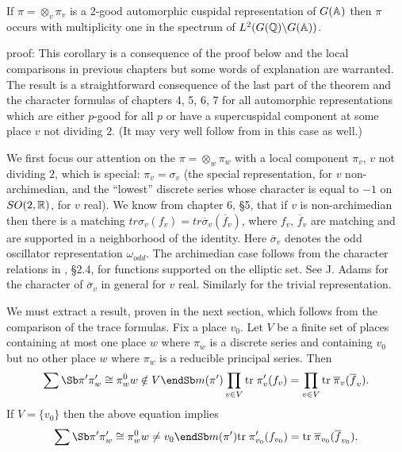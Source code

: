 \begin{corollary} If $\pi=\otimes_v \pi_v$ is a 2-good
automorphic cuspidal representation of $G({\Bbb{A}})$ then $\pi$
occurs with multiplicity one in the spectrum of
$L^2(G({\Bbb{Q}})\backslash G({\Bbb{A}}))$.
\end{corollary}

proof: This corollary is a consequence of the proof below and the local
comparisons in previous chapters but some words of
explanation are warranted.
The result is a straightforward consequence of
the last part of the theorem and the character formulas
of chapters 4, 5, 6, 7 for all automorphic representations
which are either $p$-good for all $p$ or have a supercuspidal
component at some place $v$ not dividing $2$. (It
may very well follow from \cite{LL} in this case as well.)

We first focus our attention on the $\pi=\otimes_w\pi_w$
with a local component $\pi_v$, $v$ not dividing $2$, which is
special: $\pi_v=\sigma_v$ (the special representation,
for $v$ non-archimedian, and the ``lowest'' discrete series
whose character is equal to $-1$ on $SO(2,{\Bbb{R}})$, for
$v$ real). We know from chapter 6, \S 5, that
if $v$ is non-archimedian then there is a matching
$tr \sigma_v(f_v)=tr\overline{\sigma}_v(\overline{f}_v)$,
where $f_v$, $\overline{f}_v$ are matching and are
supported in a neighborhood of the identity. Here
$\overline{\sigma}_v$ denotes the odd oscillator representation
$\omega_{odd}$. The archimedian case follows from
the character relations in \cite{Fl}, \S 2.4, for functions
supported on the elliptic set. See J. Adams \cite{Ad}
for the character of $\overline{\sigma}_v$ in general
for $v$ real. Similarly for the trivial representation.

We must extract a result, proven in the next section,
which follows from the comparison of the
trace formulas. Fix a place $v_0$.
Let $V$ be a finite set of places
containing at most one place $w$ where $\pi_w$ is a discrete series
and containing $v_0$ but no other place $w$ where $\pi_w$ is
a reducible principal series. Then
\[
\sum\Sb \pi^{\prime }\\ \pi _w^{\prime }\cong\pi _w^0\\ w\notin V \endSb 
m(\pi^{\prime })\prod_{v\in V}{\rm tr}\;\pi _v^{\prime }(f_v)
=\prod_{v\in V}{\rm tr}\;\overline{\pi }_v(\overline{f}_v).
\]
If $V=\{v_0\}$ then the above equation implies
\begin{equation}
\sum\Sb \pi^{\prime }\\ \pi _w^{\prime }\cong\pi _w^0\\ w\not= v_0 \endSb 
m(\pi^{\prime }){\rm tr}\;\pi _{v_0}^{\prime }(f_{v_0})
={\rm tr}\;\overline{\pi }_{v_0}(\overline{f}_{v_0}).
\end{equation}


